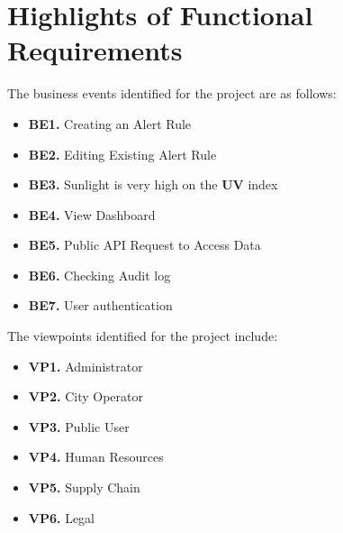\documentclass[]{article}
\begin{document}
\newpage
\section{Highlights of Functional Requirements}
\label{sec:functional_requirements}

The business events identified for the project are as follows: 

\begin{itemize}
	\item {\bf BE1.} Creating an Alert Rule
	\item {\bf BE2.} Editing Existing Alert Rule
	\item {\bf BE3.} Sunlight is very high on the \textbf{UV} index
	\item {\bf BE4.} View Dashboard
	\item {\bf BE5.} Public API Request to Access Data
	\item {\bf BE6.} Checking Audit log 
	\item {\bf BE7.} User authentication
\end{itemize}

\noindent The viewpoints identified for the project include: 
\begin{itemize}
	\item {\bf VP1.} Administrator
	\item {\bf VP2.} City Operator
	\item {\bf VP3.} Public User
	\item {\bf VP4.} Human Resources
	\item {\bf VP5.} Supply Chain
	\item {\bf VP6.} Legal
\end{itemize}
\end{document}
